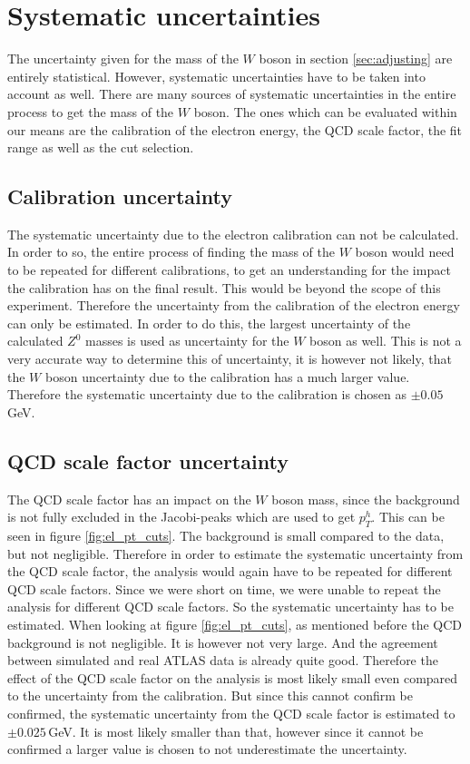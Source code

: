 \section{Systematic uncertainties}
    \label{sec:uncertainties}
    The uncertainty given for the mass of the $W$ boson in section \ref{sec:adjusting} are entirely statistical. However, systematic uncertainties have to be taken into 
    account as well. There are many sources of systematic uncertainties in the entire process to get the mass of the $W$ boson. The ones which can be evaluated within 
    our means are the calibration of the electron energy, the QCD scale factor, the fit range as well as the cut selection.

\subsection{Calibration uncertainty}
    The systematic uncertainty due to the electron calibration can not be calculated. In order to so, the entire process of finding the mass of the $W$ boson would need
    to be repeated for different calibrations, to get an understanding for the impact the calibration has on the final result. This would be beyond the scope of this 
    experiment. Therefore the uncertainty from the calibration of the electron energy can only be estimated. In order to do this, the largest uncertainty of the calculated
    $Z^0$ masses is used as uncertainty for the $W$ boson as well. This is not a very accurate way to determine this of uncertainty, it is however not likely, that the 
    $W$ boson uncertainty due to the calibration has a much larger value. Therefore the systematic uncertainty due to the calibration is chosen as $\pm0.05$\,GeV.

\subsection{QCD scale factor uncertainty}
    The QCD scale factor has an impact on the $W$ boson mass, since the background is not fully excluded in the Jacobi-peaks which are used to get $p_T^h$.
    This can be seen in figure \ref{fig:el_pt_cuts}. The background is small compared to the data, but not negligible. 
    Therefore in order to estimate the systematic uncertainty from the QCD scale factor, the analysis would again have to be repeated for different QCD scale factors.
    Since we were short on time, we were unable to repeat the analysis for different QCD scale factors. So the systematic uncertainty has to be estimated.
    When looking at figure \ref{fig:el_pt_cuts}, as mentioned before the QCD background is not negligible. It is however not very large. And the agreement between simulated
    and real ATLAS data is already quite good. Therefore the effect of the QCD scale factor on the analysis is most likely small even compared to the uncertainty from 
    the calibration. But since this cannot confirm be confirmed, the systematic uncertainty from the QCD scale factor is estimated to $\pm0.025$\,GeV. It is most likely smaller 
    than that, however since it cannot be confirmed a larger value is chosen to not underestimate the uncertainty.

